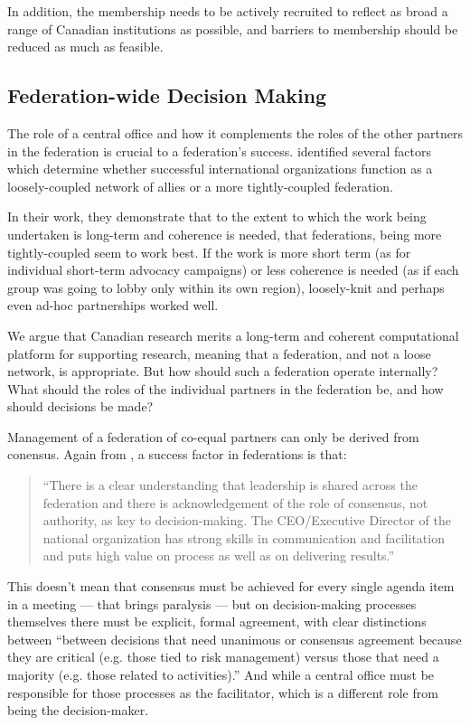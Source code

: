 \documentclass[11pt, letterpaper, twoside]{article}
\begin{document}
In addition, the membership needs to be actively recruited to reflect as
broad a range of Canadian institutions as possible, and barriers to
membership should be reduced as much as feasible.

\subsection*{Federation-wide Decision Making}
%

The role of a central office and how it complements the roles of the
other partners in the federation is crucial to a federation's success.
\cite{Brown20121098} identified several factors which
determine whether successful international organizations function as a
loosely-coupled network of allies or a more tightly-coupled federation.

In their work, they demonstrate that to the extent to which the work
being undertaken is long-term and coherence is needed, that federations,
being more tightly-coupled seem to work best. If the work is more short
term (as for individual short-term advocacy campaigns) or less coherence
is needed (as if each group was going to lobby only within its own
region), loosely-knit and perhaps even ad-hoc partnerships worked well.

We argue that Canadian research merits a long-term and coherent
computational platform for supporting research, meaning that a
federation, and not a loose network, is appropriate. But how should such
a federation operate internally? What should the roles of the individual
partners in the federation be, and how should decisions be made?

Management of a federation of co-equal partners can only be derived from
conensus.  Again from \cite{mollenhauer_framework}, a success factor in
federations is that:

\begin{quote}
``There is a clear understanding that leadership is shared across the
federation and there is acknowledgement of the role of consensus, not
authority, as key to decision-making. The CEO/Executive Director of
the national organization has strong skills in communication and
facilitation and puts high value on process as well as on delivering
results.''
\end{quote}


This doesn't mean that consensus must be achieved for every single
agenda item in a meeting --- that brings paralysis --- but on
decision-making processes themselves there must be explicit, formal
agreement, with clear distinctions between ``between decisions that need
unanimous or consensus agreement because they are critical (e.g. those
tied to risk management) versus those that need a majority (e.g. those
related to activities).'' And while a central office must be responsible
for those processes as the facilitator, which is a different role from
being the decision-maker.
\end{document}
